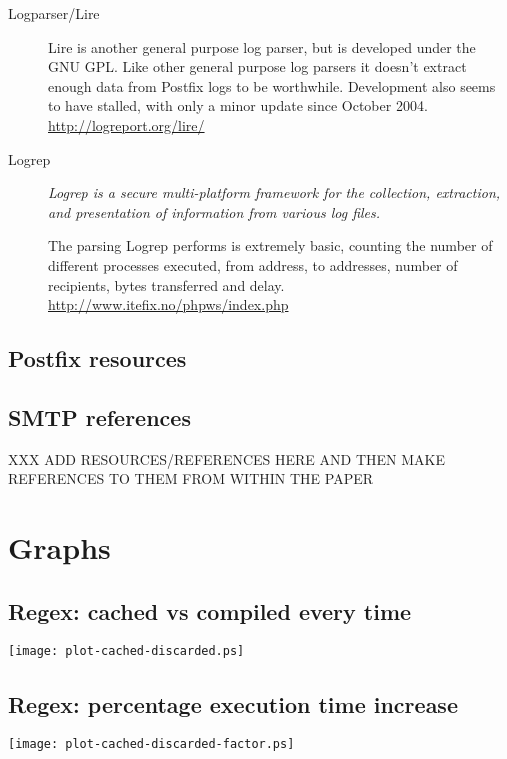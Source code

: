 \documentclass[a4paper,12pt,draft]{article}
\begin{document}
\begin{description}
    \item [Logparser/Lire] Lire is another general purpose log parser, but
        is developed under the GNU GPL\@.  Like other general purpose log
        parsers it doesn't extract enough data from Postfix logs to be
        worthwhile.  Development also seems to have stalled, with only a
        minor update since October 2004.  \newline
        \url{http://logreport.org/lire/}

    \item [Logrep] \textit{Logrep is a secure multi-platform framework for
        the collection, extraction, and presentation of information from
        various log files.\/}

        The parsing Logrep performs is extremely basic, counting the number
        of different processes executed, from address, to addresses, number
        of recipients, bytes transferred and delay.  \newline
        \url{http://www.itefix.no/phpws/index.php}

\end{description}

\subsection{Postfix resources}

\subsection{SMTP references}

XXX ADD RESOURCES/REFERENCES HERE AND THEN MAKE REFERENCES TO THEM FROM WITHIN THE PAPER





\section{Graphs}

\subsection{Regex: cached vs compiled every time}
\label{normal regex vs discard regex}
\texttt{[image: plot-cached-discarded.ps]}


\subsection{Regex: percentage execution time increase}
\label{normal regex vs disarded regex factor}
\texttt{[image: plot-cached-discarded-factor.ps]}
\end{document}
